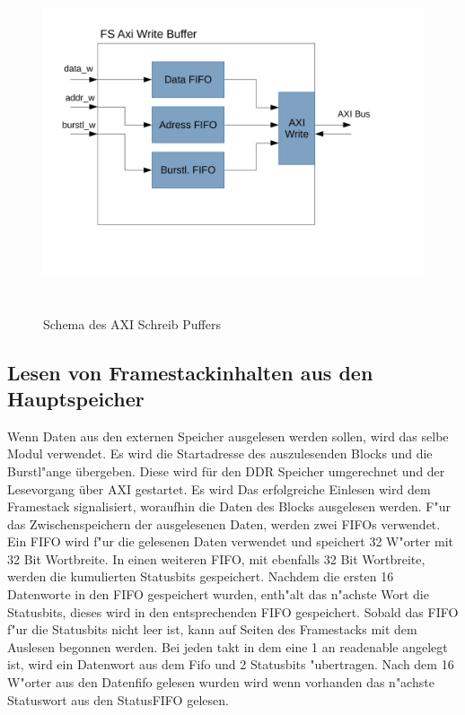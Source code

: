 \begin{figure}[H]
	\centering
	\includegraphics[height = 10cm]{PS_RS_graphics/AxiWriteBuffer.pdf}
	\caption{Schema des AXI Schreib Puffers}
\end{figure}

\subsection{Lesen von Framestackinhalten aus den Hauptspeicher}
Wenn Daten aus den externen Speicher ausgelesen werden sollen, wird das selbe Modul verwendet. Es wird die Startadresse des auszulesenden Blocks und die Burstl"ange \"ubergeben. Diese wird f\"ur den DDR Speicher umgerechnet und der Lesevorgang \"uber AXI gestartet.  Es wird  Das erfolgreiche Einlesen wird dem Framestack signalisiert, woraufhin die Daten des Blocks ausgelesen werden. F"ur das Zwischenspeichern der ausgelesenen Daten, werden zwei FIFOs verwendet. Ein FIFO wird f"ur die gelesenen Daten verwendet und speichert 32 W"orter mit 32 Bit Wortbreite. In einen weiteren FIFO, mit ebenfalls 32 Bit Wortbreite, werden die kumulierten Statusbits gespeichert. Nachdem die ersten 16 Datenworte in den FIFO gespeichert wurden, enth"alt das n"achste Wort die Statusbits, dieses wird in den entsprechenden FIFO gespeichert. Sobald das FIFO f"ur die Statusbits nicht leer ist, kann auf Seiten des Framestacks mit dem Auslesen begonnen werden. Bei jeden takt in dem eine 1 an readenable angelegt ist, wird ein Datenwort aus dem Fifo und 2 Statusbits "ubertragen. Nach dem 16 W"orter aus den Datenfifo gelesen wurden wird wenn vorhanden das n"achste Statuswort aus den StatusFIFO gelesen. 

